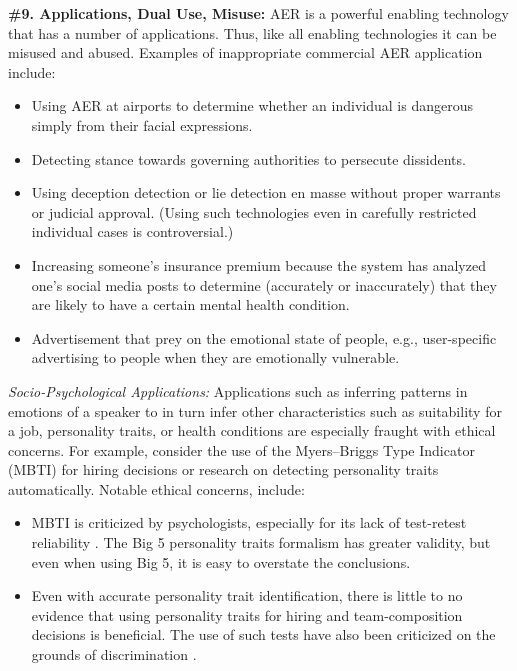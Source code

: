 \documentclass{clv3}
\begin{document}
\noindent \textbf{\#9. Applications, Dual Use, Misuse:} AER is a powerful enabling technology that has a number of applications. Thus, like all enabling technologies it can be misused and abused.
Examples of inappropriate commercial AER application include:\\[-20pt]
\begin{itemize}
    \item Using AER at airports to determine whether an individual is dangerous simply from their facial expressions.
    \vspace*{-1mm}
    \item Detecting stance towards governing authorities to persecute dissidents.
    \vspace*{-1mm}
    \item Using deception detection or lie detection en masse without proper warrants or judicial approval. (Using such technologies even in carefully restricted individual cases is controversial.)
    \vspace*{-1mm}
    \item Increasing someone’s insurance premium because the system has analyzed one’s social media posts to determine (accurately or inaccurately) that they are likely to have a certain mental health condition.
    \vspace*{-1mm}
    \item Advertisement that prey on the emotional state of people, e.g., user-specific advertising to people when they are emotionally vulnerable.
\end{itemize}
\vspace*{-1mm}
\noindent \textit{Socio-Psychological Applications:} Applications such as inferring patterns in emotions of a speaker to in turn infer other characteristics such as suitability for a job, personality traits, or health conditions are especially fraught with ethical concerns. For example, consider the use of the Myers–Briggs Type Indicator (MBTI) for hiring decisions or 
research on detecting personality traits automatically. Notable ethical concerns, include:\\[-20pt]
\begin{itemize}
    \item MBTI is criticized by psychologists, especially for its lack of test-retest reliability \cite{Boyle95,gerras2016moving,grant_2013}. The Big 5 personality traits formalism \cite{COBBCLARK201211} has greater validity, but even when using Big 5, it is easy to overstate the conclusions.
    \vspace*{-1mm}
    \item Even with accurate personality trait identification, there is little to no evidence that using personality traits for hiring and team-composition decisions is beneficial. The use of such tests have also been criticized on the grounds of discrimination \cite{snow_2020}.
\end{itemize}
\end{document}
